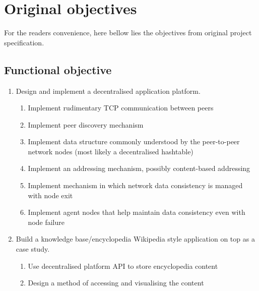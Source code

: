 \chapter{Original objectives}
\label{objectives}

For the readers convenience, here bellow lies the objectives from original project specification.

\section{Functional objective}
\begin{enumerate}
    \item Design and implement a decentralised application platform.
          \begin{enumerate}
              \item Implement rudimentary TCP communication between peers
              \item Implement peer discovery mechanism
              \item Implement data structure commonly understood by the peer-to-peer network nodes (most likely a decentralised hashtable)
              \item Implement an addressing mechanism, possibly content-based addressing
              \item Implement mechanism in which network data consistency is managed with node exit
              \item Implement agent nodes that help maintain data consistency even with node failure %
          \end{enumerate}
    \item Build a knowledge base/encyclopedia Wikipedia style application on top as a case study.
          \begin{enumerate}
              \item Use decentralised platform API to store encyclopedia content
              \item Design a method of accessing and visualising the content
          \end{enumerate}
\end{enumerate}

